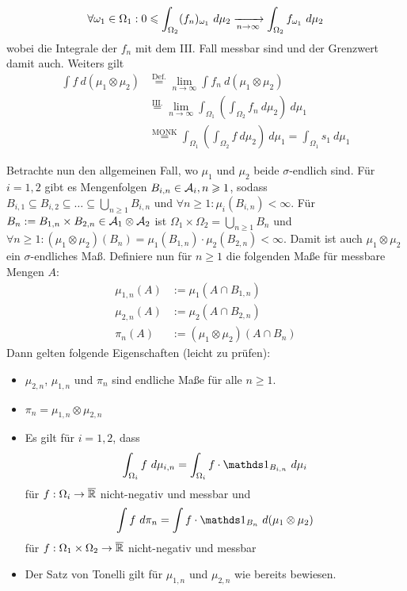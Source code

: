\documentclass[11pt]{report}
\begin{document}
\begin{enumerate}[label=\Roman*.]
    $$\forall\omega_1\in\Omega_1:0\leq\int_{\Omega_2}(f_n)_{\omega_1}\ d\mu_2\nto{}{n\to\infty}\int_{\Omega_2}f_{\omega_1}\ d\mu_2$$
    wobei die Integrale der $f_n$ mit dem III. Fall messbar sind und der Grenzwert damit auch. Weiters gilt
    \begin{align*}
        \int f\ d(\mu_1\otimes\mu_2)&\overset{\text{Def.}}{=}\lim_{n\to\infty}\int f_n\ d(\mu_1\otimes\mu_2)\\
        &\overset{\text{III.}}{=}\lim_{n\to\infty}\int_{\Omega_1}\left(\int_{\Omega_2}f_n\ d\mu_2\right)\ d\mu_1\\
        &\overset{\text{MONK}}{=}\int_{\Omega_1}\left(\int_{\Omega_2}f\ d\mu_2\right)\ d\mu_1=\int_{\Omega_1}s_1\ d\mu_1
    \end{align*}
\end{enumerate}
    Betrachte nun den allgemeinen Fall, wo $\mu_1$ und $\mu_2$ beide $\sigma$-endlich sind.\newline
    F\"ur $i=1,2$ gibt es Mengenfolgen $B_{i,n}\in\mathcal{A}_i,n\geqslant1$, sodass $B_{i,1}\subseteq B_{i,2}\subseteq\hdots\subseteq\bigcup_{n\geq1}B_{i,n}$ und $\forall n\geq1:\mu_i(B_{i,n})<\infty$. F\"ur $B_n:=B_{1,n}\times B_{2,n}\in\mathcal{A}_1\otimes\mathcal{A}_2$ ist $\Omega_1\times\Omega_2=\bigcup_{n\geq1}B_n$ und $\forall n\geq1:(\mu_1\otimes\mu_2)(B_n)=\mu_1(B_{1,n})\cdot\mu_2(B_{2,n})<\infty$. Damit ist auch $\mu_1\otimes\mu_2$ ein $\sigma$-endliches Ma\ss{}. Definiere nun f\"ur $n\geq1$ die folgenden Ma\ss{}e f\"ur messbare Mengen $A$:
    \begin{align*}
        \mu_{1,n}(A)&:=\mu_1(A\cap B_{1,n}) \\
        \mu_{2,n}(A)&:=\mu_2(A\cap B_{2,n}) \\
        \pi_n(A)&:=(\mu_1\otimes\mu_2)(A\cap B_n)
    \end{align*}
    Dann gelten folgende Eigenschaften (leicht zu pr\"ufen):
    \begin{itemize}
        \item $\mu_{2,n}$, $\mu_{1,n}$ und $\pi_n$ sind endliche Ma\ss{}e f\"ur alle $n\geq1$.
        \item $\pi_n=\mu_{1,n}\otimes\mu_{2,n}$
        \item Es gilt f\"ur $i=1,2$, dass 
        \begin{equation*}
            \int_{\Omega_i}f\ d\mu_{i,n}=\int_{\Omega_i}f\cdot\ind{B_{i,n}}\ d\mu_i
        \end{equation*}
        f\"ur $f:\Omega_i\to\overline{\mathbb{R}}$ nicht-negativ und messbar und
        \begin{equation*}
            \int f\ d\pi_n=\int f\cdot\ind{B_n}\ d(\mu_1\otimes\mu_2)
        \end{equation*}
        f\"ur $f:\Omega_1\times\Omega_2\to\overline{\mathbb{R}}$ nicht-negativ und messbar
        \item Der Satz von Tonelli gilt f\"ur $\mu_{1,n}$ und $\mu_{2,n}$ wie bereits bewiesen.
    \end{itemize}
\end{document}
